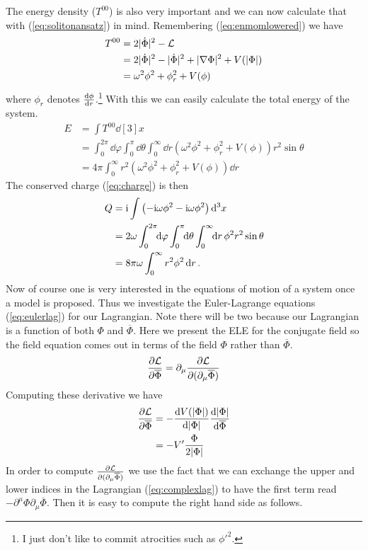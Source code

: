 The energy density ($T^{00}$) is also very important and we can now calculate that with (\ref{eq:solitonansatz}) in mind. Remembering (\ref{eq:enmomlowered}) we have
\begin{align}
T^{00} & = 2|\dot{\Phi}|^2 - \mathcal{L} \\
 & = 2|\dot{\Phi}|^2 - |\dot{\Phi}|^2 + |\nabla\Phi|^2 + V(|\Phi|) \\
 & = \omega^2\phi^2 + \phi_r^2 + V(\phi)
\end{align}
where $\phi_r$ denotes $\dv{\phi}{r}$.\footnote{I just don't like to commit atrocities such as $\phi'^2$.} With this we can easily calculate the total energy of the system.
\begin{align}
E & = \int T^{00}\dd[3]{x} \\
 & = \int_0^{2\pi}\!\!\dd{\varphi}\int_0^\pi\!\!\dd{\theta}\int_0^\infty\!\!\dd{r}\left(\omega^2\phi^2 + \phi_r^2 + V(\phi)\right)r^2\sin{\theta} \\
 & = 4\pi\int_0^\infty r^2\left(\omega^2\phi^2 + \phi_r^2 + V(\phi)\right)\dd{r} \label{eq:nospinenergy}
\end{align}
The conserved charge (\ref{eq:charge}) is then
\begin{align}
Q & = \mathrm{i}\int\left(-\mathrm{i}\omega\phi^2 - \mathrm{i}\omega\phi^2\right)\dd[3]{x} \\
 & = 2\omega\int_0^{2\pi}\!\!\dd{\varphi}\int_0^\pi\!\!\dd{\theta}\int_0^\infty\!\!\dd{r}\phi^2 r^2\sin{\theta} \\
 & = 8\pi\omega\int_0^\infty r^2\phi^2\dd{r} \label{eq:nospincharge}.
\end{align}
Now of course one is very interested in the equations of motion of a system once a model is proposed. Thus we investigate the Euler-Lagrange equations (\ref{eq:eulerlag}) for our Lagrangian. Note there will be two because our Lagrangian is a function of both $\Phi$ and $\overline{\Phi}$. Here we present the ELE for the conjugate field so the field equation comes out in terms of the field $\Phi$ rather than $\overline{\Phi}$.
\begin{equation}
\pdv{\mathcal{L}}{\overline{\Phi}} = \partial_\mu\pdv{\mathcal{L}}{(\partial_\mu\overline{\Phi})}
\end{equation}
Computing these derivative we have
\begin{align}
\pdv{\mathcal{L}}{\overline{\Phi}} & = -\dv{V(|\Phi|)}{|\Phi|}\dv{|\Phi|}{\overline{\Phi}} \\
 & = -V'\frac{\Phi}{2|\Phi|}
\end{align}
In order to compute $\pdv{\mathcal{L}}{(\partial_\mu\overline{\Phi})}$ we use the fact that we can exchange the upper and lower indices in the Lagrangian (\ref{eq:complexlag}) to have the first term read $-\partial^\mu\Phi\partial_\mu\overline{\Phi}$. Then it is easy to compute the right hand side as follows.

